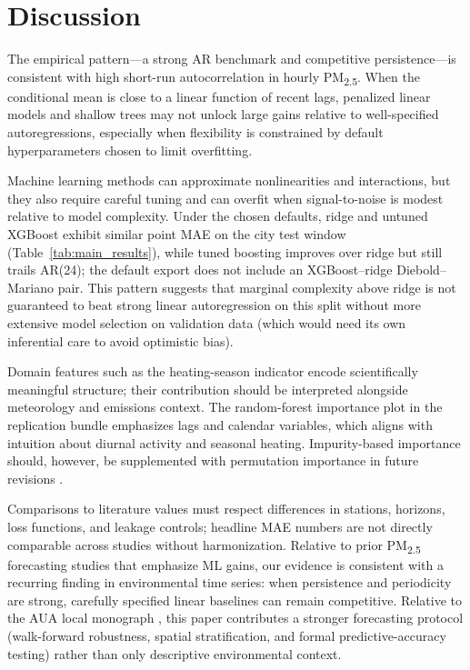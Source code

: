 \documentclass[11pt,a4paper]{article}
\begin{document}
\section{Discussion}
\label{sec:discussion}

The empirical pattern---a strong AR benchmark and competitive persistence---is consistent with high short-run autocorrelation in hourly PM\textsubscript{2.5}. When the conditional mean is close to a linear function of recent lags, penalized linear models and shallow trees may not unlock large gains relative to well-specified autoregressions, especially when flexibility is constrained by default hyperparameters chosen to limit overfitting.

Machine learning methods can approximate nonlinearities and interactions, but they also require careful tuning and can overfit when signal-to-noise is modest relative to model complexity. Under the chosen defaults, ridge and untuned XGBoost exhibit similar point MAE on the city test window (Table~\ref{tab:main_results}), while tuned boosting improves over ridge but still trails AR(24); the default export does not include an XGBoost--ridge Diebold--Mariano pair. This pattern suggests that marginal complexity above ridge is not guaranteed to beat strong linear autoregression on this split without more extensive model selection on validation data (which would need its own inferential care to avoid optimistic bias).

Domain features such as the heating-season indicator encode scientifically meaningful structure; their contribution should be interpreted alongside meteorology and emissions context. The random-forest importance plot in the replication bundle emphasizes lags and calendar variables, which aligns with intuition about diurnal activity and seasonal heating. Impurity-based importance should, however, be supplemented with permutation importance in future revisions \citep{lundberg2017unified}.

Comparisons to literature values must respect differences in stations, horizons, loss functions, and leakage controls; headline MAE numbers are not directly comparable across studies without harmonization. Relative to prior PM\textsubscript{2.5} forecasting studies that emphasize ML gains, our evidence is consistent with a recurring finding in environmental time series: when persistence and periodicity are strong, carefully specified linear baselines can remain competitive. Relative to the AUA local monograph \citep{auaair2025yerevan}, this paper contributes a stronger forecasting protocol (walk-forward robustness, spatial stratification, and formal predictive-accuracy testing) rather than only descriptive environmental context.
\end{document}
